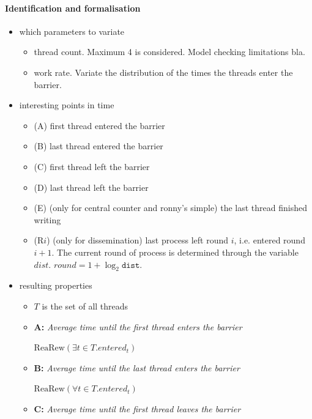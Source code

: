 \documentclass[a4paper, 10pt]{article}
\begin{document}
\paragraph{Identification and formalisation}
\label{ssssec:analysis-modelchecking-quantitative-properties-identification}
\begin{itemize}
	\item which parameters to variate
		\begin{itemize}
			\item thread count. Maximum 4 is considered. Model checking limitations bla.
			\item work rate. Variate the distribution of the times the threads enter the barrier.
		\end{itemize}
	\item interesting points in time
		\begin{itemize}
			\item (A) first thread entered the barrier
			\item (B) last thread entered the barrier
			\item (C) first thread left the barrier
			\item (D) last thread left the barrier
			\item (E) (only for central counter and ronny's simple) the last thread finished writing
			\item (R$i$) (only for dissemination) last process left round $i$, i.e. entered round $i+1$. The current round of process is determined through the variable $\mathit{dist}$. $\mathit{round} = 1 + \log_2 \mathtt{dist}$.
		\end{itemize}
	\item resulting properties
		\begin{itemize}
			\item $T$ is the set of all threads
			\item \textbf{A:} \emph{Average time until the first thread enters the barrier}
				\begin{center}
					$\mathrm{ReaRew}(\exists t \in T . \mathit{entered_t} )$
				\end{center}
			\item \textbf{B:} \emph{Average time until the last thread enters the barrier}
				\begin{center}
					$\mathrm{ReaRew}(\forall t \in T . \mathit{entered_t} )$
				\end{center}
			\item \textbf{C:} \emph{Average time until the first thread leaves the barrier}

\end{itemize}
\end{itemize}
\end{document}
